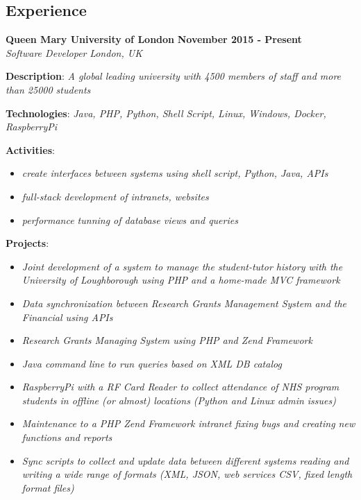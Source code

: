 \documentclass[margin]{res}
\begin{document}
\begin{resume}
\section{Experience}
  \textbf{Queen Mary University of London} \hfill \textbf{November 2015 - Present}\\
  \textit{Software Developer} \hfill \textit{London, UK}\\
  \begin{description}
    \item{\textbf{Description}: \textit{A global leading university with 4500 members of staff and more than 25000 students}}
    \item{\textbf{Technologies}: \textit{Java, PHP, Python, Shell Script, Linux, Windows, Docker, RaspberryPi}}
    \item{
      \textbf{Activities}:
      \begin{itemize}
        \item{\textit{create interfaces between systems using shell script, Python, Java, APIs}}
        \item{\textit{full-stack development of intranets, websites}}
        \item{\textit{performance tunning of database views and queries}}
      \end{itemize}
    }
    \item{
      \textbf{Projects}:
      \begin{itemize}
        \item{\textit{Joint development of a system to manage the student-tutor history with the University of Loughborough using PHP and a home-made MVC framework}}
        \item{\textit{Data synchronization between Research Grants Management System and the Financial using APIs}}
        \item{\textit{Research Grants Managing System using PHP and Zend Framework}}
        \item{\textit{Java command line to run queries based on XML DB catalog}}
        \item{\textit{RaspberryPi with a RF Card Reader to collect attendance of NHS program students in offline (or almost) locations (Python and Linux       admin issues)}}
        \item{\textit{Maintenance to a PHP Zend Framework intranet fixing bugs and creating new functions and reports}}
        \item{\textit{Sync scripts to collect and update data between different systems reading and writing a wide range of formats (XML, JSON, web services      CSV, fixed length format files)}}

\end{itemize}}
\end{description}
\end{resume}
\end{document}

